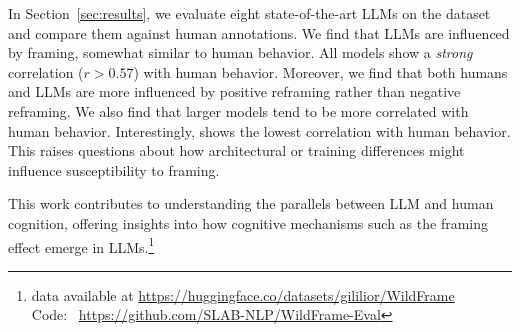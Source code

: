 
 In Section~\ref{sec:results}, we evaluate eight state-of-the-art LLMs
on the \name{} dataset and compare them against human annotations. We find  that LLMs are influenced by framing, somewhat similar to human behavior. All models show a \emph{strong} correlation ($r>0.57$) with human behavior.
Moreover, we find that both humans and LLMs are more influenced by positive reframing rather than negative reframing. We also find that larger models tend to be more correlated with human behavior. Interestingly, \gpt{} shows the lowest correlation with human behavior. This raises questions about how architectural or training differences might influence susceptibility to framing. 

This work contributes to understanding the parallels between LLM and human cognition, offering insights into how cognitive mechanisms such as the framing effect emerge in LLMs.\footnote{\name{} data available at \url{https://huggingface.co/datasets/gililior/WildFrame}\\Code: ~\url{https://github.com/SLAB-NLP/WildFrame-Eval}}






